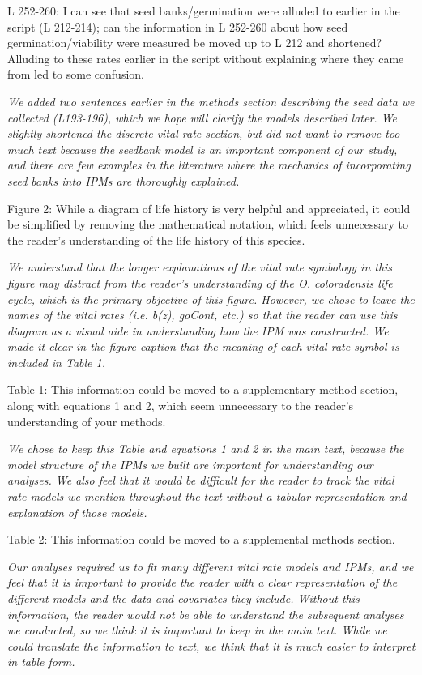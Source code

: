 \documentclass[12pt, letterpaper]{article}
\begin{document}
\begin{flushleft}
L 252-260: I can see that seed banks/germination were alluded to earlier in the script (L 212-214); can the information in L 252-260 about how seed germination/viability were measured be moved up to L 212 and shortened? Alluding to these rates earlier in the script without explaining where they came from led to some confusion.

\textit{We added two sentences earlier in the methods section describing the seed data we collected (L193-196), which we hope will clarify the models described later. We slightly shortened the discrete vital rate section, but did not want to remove too much text because the seedbank model is an important component of our study, and there are few examples in the literature where the mechanics of incorporating seed banks into IPMs are thoroughly explained. }

Figure 2: While a diagram of life history is very helpful and appreciated, it could be simplified by removing the mathematical notation, which feels unnecessary to the reader’s understanding of the life history of this species.

\textit{We understand that the longer explanations of the vital rate symbology in this figure may distract from the reader's understanding of the \textit{O. coloradensis} life cycle, which is the primary objective of this figure. However, we chose to leave the names of the vital rates (i.e. b(z), goCont, etc.) so that the reader can use this diagram as a visual aide in understanding how the IPM was constructed. We made it clear in the figure caption that the meaning of each vital rate symbol is included in Table 1. }

Table 1: This information could be moved to a supplementary method section, along with equations 1 and 2, which seem unnecessary to the reader’s understanding of your methods.

\textit{We chose to keep this Table and equations 1 and 2 in the main text, because the model structure of the IPMs we built are important for understanding our analyses. We also feel that it would be difficult for the reader to track the vital rate models we mention throughout the text without a tabular representation and explanation of those models.   }

Table 2: This information could be moved to a supplemental methods section.

\textit{Our analyses required us to fit many different vital rate models and IPMs, and we feel that it is important to provide the reader with a clear representation of the different models and the data and covariates they include. Without this information, the reader would not be able to understand the subsequent analyses we conducted, so we think it is important to keep in the main text. While we could translate the information to text, we think that it is much easier to interpret in table form. }


\end{flushleft}
\end{document}
